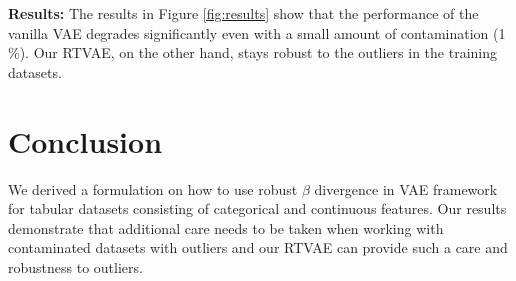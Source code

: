 \documentclass{article}
\theoremstyle{plain}
\theoremstyle{definition}
\begin{document}
\textbf{Results:} The results in Figure \ref{fig:results} show that the performance of the vanilla VAE degrades significantly even with a small amount of contamination (1 \%). Our RTVAE, on the other hand, stays robust to the outliers in the training datasets.

\section{Conclusion}
We derived a formulation on how to use robust $\beta$ divergence in VAE framework for tabular datasets consisting of categorical and continuous features. Our results demonstrate that additional care needs to be taken when working with contaminated datasets with outliers and our RTVAE can provide such a care and robustness to outliers.  %
\nocite{langley00}



\end{document}
